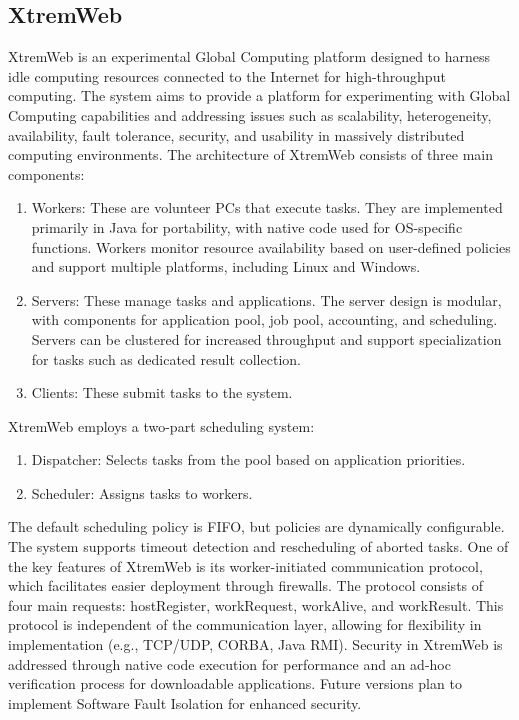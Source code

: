 \subsection{XtremWeb}
\label{subsec:background:related_work:xtremweb}
XtremWeb is an experimental Global Computing platform designed to harness idle computing resources connected to the Internet for high-throughput computing. The system aims to provide a platform for experimenting with Global Computing capabilities and addressing issues such as scalability, heterogeneity, availability, fault tolerance, security, and usability in massively distributed computing environments.
The architecture of XtremWeb consists of three main components:
\begin{enumerate}
  \item Workers: These are volunteer PCs that execute tasks. They are implemented primarily in Java for portability, with native code used for OS-specific functions. Workers monitor resource availability based on user-defined policies and support multiple platforms, including Linux and Windows.
  \item Servers: These manage tasks and applications. The server design is modular, with components for application pool, job pool, accounting, and scheduling. Servers can be clustered for increased throughput and support specialization for tasks such as dedicated result collection.
  \item Clients: These submit tasks to the system.
\end{enumerate}
XtremWeb employs a two-part scheduling system:
\begin{enumerate}
  \item Dispatcher: Selects tasks from the pool based on application priorities.
  \item Scheduler: Assigns tasks to workers.
\end{enumerate}
The default scheduling policy is FIFO, but policies are dynamically configurable. The system supports timeout detection and rescheduling of aborted tasks.
One of the key features of XtremWeb is its worker-initiated communication protocol, which facilitates easier deployment through firewalls. The protocol consists of four main requests: hostRegister, workRequest, workAlive, and workResult. This protocol is independent of the communication layer, allowing for flexibility in implementation (e.g., TCP/UDP, CORBA, Java RMI).
Security in XtremWeb is addressed through native code execution for performance and an ad-hoc verification process for downloadable applications. Future versions plan to implement Software Fault Isolation for enhanced security.
